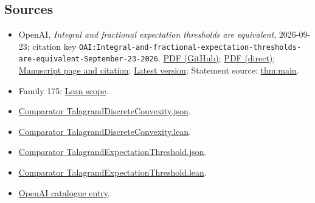 \documentclass[11pt]{article}
\begin{document}
\subsection{Sources}
\begin{itemize}
\item OpenAI, \emph{Integral and fractional expectation thresholds are equivalent}, 2026-09-23; citation key \texttt{OAI:Integral-and-fractional-expectation-thresholds-are-equivalent-September-23-2026}. \href{https://github.com/openai/math/blob/adc7f1241b42e322a6451854ab7e4b4c146bf78a/preprints/Integral-and-fractional-expectation-thresholds-are-equivalent-September-23-2026/paper.pdf}{PDF (GitHub)}; \href{https://github.com/openai/math/raw/adc7f1241b42e322a6451854ab7e4b4c146bf78a/preprints/Integral-and-fractional-expectation-thresholds-are-equivalent-September-23-2026/paper.pdf}{PDF (direct)}; \href{https://github.com/openai/math/blob/adc7f1241b42e322a6451854ab7e4b4c146bf78a/preprints/Integral-and-fractional-expectation-thresholds-are-equivalent-September-23-2026/README.md}{Manuscript page and citation}; \href{https://github.com/openai/math/blob/main/preprints/Integral-and-fractional-expectation-thresholds-are-equivalent-September-23-2026/paper.pdf}{Latest version}; Statement source: \href{https://github.com/openai/math/blob/adc7f1241b42e322a6451854ab7e4b4c146bf78a/preprints/Integral-and-fractional-expectation-thresholds-are-equivalent-September-23-2026/build/source/sections/introduction.tex\#L52}{thm:main}.
\item Family 175: \href{https://github.com/openai/math/blob/adc7f1241b42e322a6451854ab7e4b4c146bf78a/lean/docs/175.md}{Lean scope}.
\item \href{https://github.com/openai/math/blob/adc7f1241b42e322a6451854ab7e4b4c146bf78a/lean/ComparatorChallenges/TalagrandDiscreteConvexity.json}{Comparator TalagrandDiscreteConvexity.json}.
\item \href{https://github.com/openai/math/blob/adc7f1241b42e322a6451854ab7e4b4c146bf78a/lean/ComparatorChallenges/TalagrandDiscreteConvexity.lean}{Comparator TalagrandDiscreteConvexity.lean}.
\item \href{https://github.com/openai/math/blob/adc7f1241b42e322a6451854ab7e4b4c146bf78a/lean/ComparatorChallenges/TalagrandExpectationThreshold.json}{Comparator TalagrandExpectationThreshold.json}.
\item \href{https://github.com/openai/math/blob/adc7f1241b42e322a6451854ab7e4b4c146bf78a/lean/ComparatorChallenges/TalagrandExpectationThreshold.lean}{Comparator TalagrandExpectationThreshold.lean}.
\item \href{https://github.com/openai/math/blob/adc7f1241b42e322a6451854ab7e4b4c146bf78a/CONTENTS.md}{OpenAI catalogue entry}.
\end{itemize}
\end{document}
